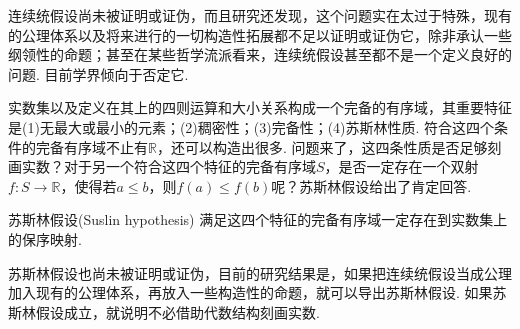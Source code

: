 \documentclass[main.tex]{subfiles}
\begin{document}
连续统假设尚未被证明或证伪，而且研究还发现，这个问题实在太过于特殊，现有的公理体系以及将来进行的一切构造性拓展都不足以证明或证伪它，除非承认一些纲领性的命题；甚至在某些哲学流派看来，连续统假设甚至都不是一个定义良好的问题. 目前学界倾向于否定它.

实数集以及定义在其上的四则运算和大小关系构成一个完备的有序域，其重要特征是(1)无最大或最小的元素；(2)稠密性；(3)完备性；(4)苏斯林性质. 符合这四个条件的完备有序域不止有\(\mathbb{R}\)，还可以构造出很多. 问题来了，这四条性质是否足够刻画实数？对于另一个符合这四个特征的完备有序域\(S\)，是否一定存在一个双射\(f:S\to \mathbb{R}\)，使得若\(a\leq b\)，则\(f(a)\leq f(b)\)呢？苏斯林假设给出了肯定回答.
\begin{proposition}{苏斯林假设(Suslin hypothesis)}
    满足这四个特征的完备有序域一定存在到实数集上的保序映射.
\end{proposition}

苏斯林假设也尚未被证明或证伪，目前的研究结果是，如果把连续统假设当成公理加入现有的公理体系，再放入一些构造性的命题，就可以导出苏斯林假设. 如果苏斯林假设成立，就说明不必借助代数结构刻画实数.

\vspace{1cm}
\end{document}
